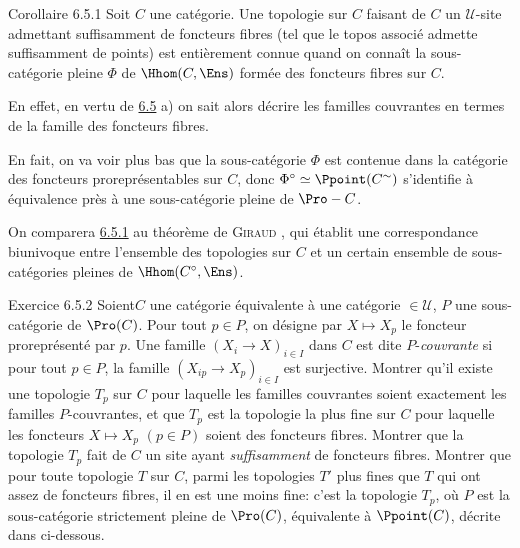 \documentclass[10pt]{../fichiers-configuration-latex/smfart}
\begin{document}
\begin{enonce*}{Corollaire 6.5.1}
Soit $C$ une catégorie. Une topologie sur $C$ faisant de $C$ un
$𝒰$-site admettant suffisamment de foncteurs fibres (\ie tel
que le topos associé admette suffisamment de points) est entièrement
connue quand on connaît la sous-catégorie pleine $\Phi$ de
$\Hhom(C,\Ens)$ formée des foncteurs fibres sur $C$.
\end{enonce*}

En effet, en vertu de \hyperref[IV.prop6.5]{6.5} a) on sait alors décrire les
familles couvrantes en termes de la famille des foncteurs fibres.

En fait, on va voir plus bas  que la sous-catégorie
$\Phi$ est contenue dans la catégorie des foncteurs
proreprésentables sur $C$, donc $\Phi^{\circ}\simeq
\Ppoint(C^{\sim})$ s'identifie à équivalence près à une
sous-catégorie pleine de $\Pro-C$.

On comparera \hyperref[IV.cor6.5.1]{6.5.1} au théorème de \textsc{Giraud}
, qui établit une correspondance biunivoque entre
l'ensemble des topologies sur $C$ et un certain ensemble de
sous-catégories pleines de $\Hhom(C^{\circ},\Ens)$.

\begin{enonce*}[remark]{Exercice 6.5.2}
Soient\pageoriginale $C$ une catégorie équivalente à une catégorie
$\in 𝒰$, $P$ une sous-catégorie de $\Pro(C)$. Pour tout
$p\in P$, on désigne par $X\mapsto X_p$ le foncteur proreprésenté
par $p$. Une famille $(X_i\rightarrow X)_{i\in I}$ dans $C$ est dite
$P$-\emph{couvrante} si pour tout $p\in P$, la famille
$(X_{ip}\rightarrow X_p)_{i\in I}$ est surjective. Montrer qu'il
existe une topologie $T_p$ sur $C$ pour laquelle les familles
couvrantes soient exactement les familles $P$-couvrantes, et que
$T_p$ est la topologie la plus fine sur $C$ pour laquelle les
foncteurs $X\mapsto X_p$ $(p\in P)$ soient des foncteurs fibres.
Montrer que la topologie $T_p$ fait de $C$ un site ayant
\emph{suffisamment} de foncteurs fibres. Montrer que pour toute
topologie $T$ sur $C$, parmi les topologies $T'$ plus fines que $T$
qui ont assez de foncteurs fibres, il en est une moins fine: c'est
la topologie $T_p$, où $P$ est la sous-catégorie strictement pleine
de $\Pro(C)$, équivalente à $\Ppoint(C)$, décrite dans
ci-dessous.
\end{enonce*}
\end{document}
